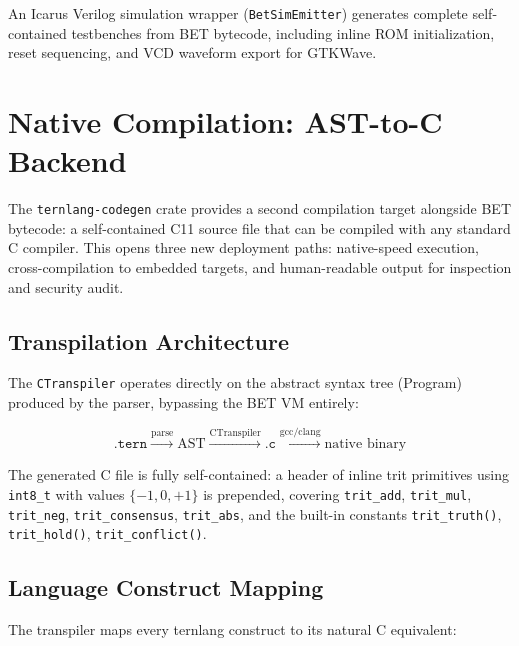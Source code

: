 \documentclass[journal,10pt,twocolumn]{IEEEtran}
\begin{document}
An Icarus Verilog simulation wrapper (\texttt{BetSimEmitter}) generates
complete self-contained testbenches from BET bytecode, including inline ROM
initialization, reset sequencing, and VCD waveform export for GTKWave.

\section{Native Compilation: AST-to-C Backend}
\label{sec:codegen}

The \texttt{ternlang-codegen} crate provides a second compilation target
alongside BET bytecode: a self-contained C11 source file that can be compiled
with any standard C compiler. This opens three new deployment paths:
native-speed execution, cross-compilation to embedded targets, and human-readable
output for inspection and security audit.

\subsection{Transpilation Architecture}

The \texttt{CTranspiler} operates directly on the abstract syntax tree (Program)
produced by the parser, bypassing the BET VM entirely:

\begin{equation}
  \texttt{.tern} \xrightarrow{\text{parse}} \text{AST}
  \xrightarrow{\text{CTranspiler}} \texttt{.c}
  \xrightarrow{\text{gcc/clang}} \text{native binary}
  \label{eq:ctranspile}
\end{equation}

The generated C file is fully self-contained: a header of inline trit
primitives using \texttt{int8\_t} with values $\{-1, 0, +1\}$ is prepended,
covering \texttt{trit\_add}, \texttt{trit\_mul}, \texttt{trit\_neg},
\texttt{trit\_consensus}, \texttt{trit\_abs}, and the built-in constants
\texttt{trit\_truth()}, \texttt{trit\_hold()}, \texttt{trit\_conflict()}.

\subsection{Language Construct Mapping}

The transpiler maps every ternlang construct to its natural C equivalent:
\end{document}
